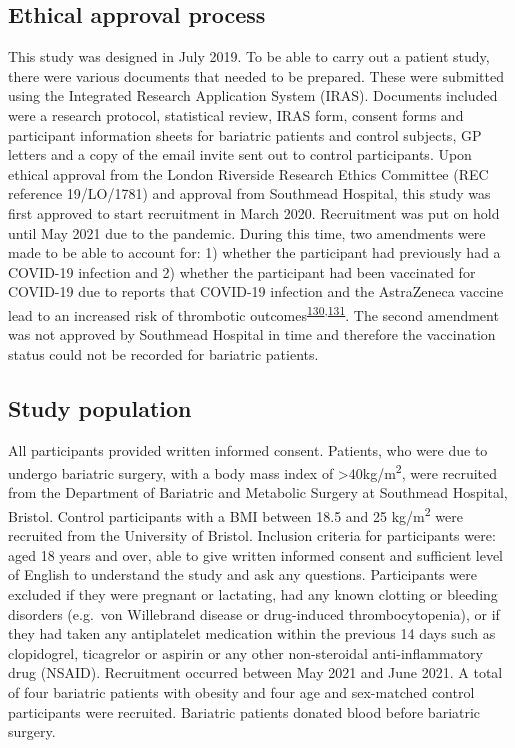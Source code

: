 \documentclass[11pt,twoside]{bristolthesis}
\begin{document}
\hypertarget{ethical-approval-process}{%
\subsection{Ethical approval process}\label{ethical-approval-process}}

This study was designed in July 2019. To be able to carry out a patient study, there were various documents that needed to be prepared. These were submitted using the Integrated Research Application System (IRAS). Documents included were a research protocol, statistical review, IRAS form, consent forms and participant information sheets for bariatric patients and control subjects, GP letters and a copy of the email invite sent out to control participants. Upon ethical approval from the London Riverside Research Ethics Committee (REC reference 19/LO/1781) and approval from Southmead Hospital, this study was first approved to start recruitment in March 2020. Recruitment was put on hold until May 2021 due to the pandemic. During this time, two amendments were made to be able to account for: 1) whether the participant had previously had a COVID-19 infection and 2) whether the participant had been vaccinated for COVID-19 due to reports that COVID-19 infection and the AstraZeneca vaccine lead to an increased risk of thrombotic outcomes\textsuperscript{\protect\hyperlink{ref-Middeldorp2020}{130},\protect\hyperlink{ref-Scully2021}{131}}. The second amendment was not approved by Southmead Hospital in time and therefore the vaccination status could not be recorded for bariatric patients.

\hypertarget{study-population-1}{%
\subsection{Study population}\label{study-population-1}}

All participants provided written informed consent. Patients, who were due to undergo bariatric surgery, with a body mass index of \textgreater40kg/m\textsuperscript{2}, were recruited from the Department of Bariatric and Metabolic Surgery at Southmead Hospital, Bristol. Control participants with a BMI between 18.5 and 25 kg/m\textsuperscript{2} were recruited from the University of Bristol. Inclusion criteria for participants were: aged 18 years and over, able to give written informed consent and sufficient level of English to understand the study and ask any questions. Participants were excluded if they were pregnant or lactating, had any known clotting or bleeding disorders (e.g.~von Willebrand disease or drug-induced thrombocytopenia), or if they had taken any antiplatelet medication within the previous 14 days such as clopidogrel, ticagrelor or aspirin or any other non-steroidal anti-inflammatory drug (NSAID). Recruitment occurred between May 2021 and June 2021. A total of four bariatric patients with obesity and four age and sex-matched control participants were recruited. Bariatric patients donated blood before bariatric surgery.
\end{document}
